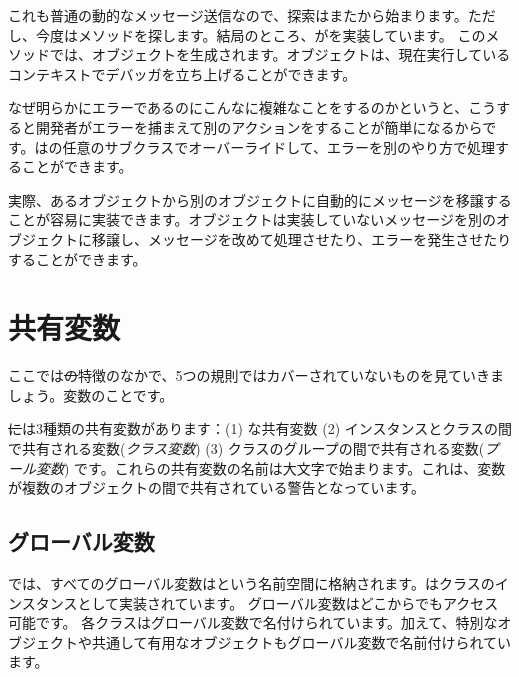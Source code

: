 \documentclass[a4paper,10pt,twoside]{book}
\begin{document}
{これも普通の動的なメッセージ送信なので、探索はまたから始まります。ただし、今度はメソッドを探します。結局のところ、がを実装しています。
このメソッドでは、オブジェクトを生成されます。オブジェクトは、現在実行しているコンテキストでデバッガを立ち上げることができます。

なぜ明らかにエラーであるのにこんなに複雑なことをするのかというと、こうすると開発者がエラーを捕まえて別のアクションをすることが簡単になるからです。はの任意のサブクラスでオーバーライドして、エラーを別のやり方で処理することができます。

実際、あるオブジェクトから別のオブジェクトに自動的にメッセージを移譲することが容易に実装できます。オブジェクトは実装していないメッセージを別のオブジェクトに移譲し、メッセージを改めて処理させたり、エラーを発生させたりすることができます。

\section{共有変数}

ここでは\st の特徴のなかで、5つの規則ではカバーされていないものを見ていきましょう。変数のことです。

\st には3種類の共有変数があります：(1) な共有変数 (2) インスタンスとクラスの間で共有される変数(\emph{クラス変数}) (3) クラスのグループの間で共有される変数(\emph{プール変数}) です。これらの共有変数の名前は大文字で始まります。これは、変数が複数のオブジェクトの間で共有されている警告となっています。


\subsection{グローバル変数}
\pharo では、すべてのグローバル変数はという名前空間に格納されます。はクラスのインスタンスとして実装されています。
グローバル変数はどこからでもアクセス可能です。
各クラスはグローバル変数で名付けられています。加えて、特別なオブジェクトや共通して有用なオブジェクトもグローバル変数で名前付けられています。

}
\end{document}
